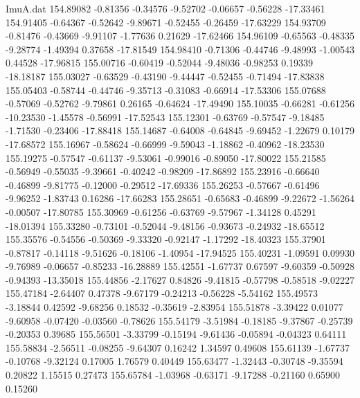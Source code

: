 \begin{filecontents}{ImuA.dat}
 154.89082   -0.81356   -0.34576   -9.52702   -0.06657   -0.56228  -17.33461
 154.91405   -0.64367   -0.52642   -9.89671   -0.52455   -0.26459  -17.63229
 154.93709   -0.81476   -0.43669   -9.91107   -1.77636    0.21629  -17.62466
 154.96109   -0.65563   -0.48335   -9.28774   -1.49394    0.37658  -17.81549
 154.98410   -0.71306   -0.44746   -9.48993   -1.00543    0.44528  -17.96815
 155.00716   -0.60419   -0.52044   -9.48036   -0.98253    0.19339  -18.18187
 155.03027   -0.63529   -0.43190   -9.44447   -0.52455   -0.71494  -17.83838
 155.05403   -0.58744   -0.44746   -9.35713   -0.31083   -0.66914  -17.53306
 155.07688   -0.57069   -0.52762   -9.79861    0.26165   -0.64624  -17.49490
 155.10035   -0.66281   -0.61256  -10.23530   -1.45578   -0.56991  -17.52543
 155.12301   -0.63769   -0.57547   -9.18485   -1.71530   -0.23406  -17.88418
 155.14687   -0.64008   -0.64845   -9.69452   -1.22679    0.10179  -17.68572
 155.16967   -0.58624   -0.66999   -9.59043   -1.18862   -0.40962  -18.23530
 155.19275   -0.57547   -0.61137   -9.53061   -0.99016   -0.89050  -17.80022
 155.21585   -0.56949   -0.55035   -9.39661   -0.40242   -0.98209  -17.86892
 155.23916   -0.66640   -0.46899   -9.81775   -0.12000   -0.29512  -17.69336
 155.26253   -0.57667   -0.61496   -9.96252   -1.83743    0.16286  -17.66283
 155.28651   -0.65683   -0.46899   -9.22672   -1.56264   -0.00507  -17.80785
 155.30969   -0.61256   -0.63769   -9.57967   -1.34128    0.45291  -18.01394
 155.33280   -0.73101   -0.52044   -9.48156   -0.93673   -0.24932  -18.65512
 155.35576   -0.54556   -0.50369   -9.33320   -0.92147   -1.17292  -18.40323
 155.37901   -0.87817   -0.14118   -9.51626   -0.18106   -1.40954  -17.94525
 155.40231   -1.09591    0.09930   -9.76989   -0.06657   -0.85233  -16.28889
 155.42551   -1.67737    0.67597   -9.60359   -0.50928   -0.94393  -13.35018
 155.44856   -2.17627    0.84826   -9.41815   -0.57798   -0.58518   -9.02227
 155.47184   -2.64407    0.47378   -9.67179   -0.24213   -0.56228   -5.54162
 155.49573   -3.18844    0.42592   -9.68256    0.18532   -0.35619   -2.83954
 155.51878   -3.39422    0.01077   -9.60958   -0.07420   -0.03560   -0.78626
 155.54179   -3.51984   -0.18185   -9.37867   -0.25739   -0.20353    0.39685
 155.56501   -3.33799   -0.15194   -9.61436   -0.05894   -0.04323    0.64111
 155.58834   -2.56511   -0.08255   -9.64307    0.16242    1.34597    0.49608
 155.61139   -1.67737   -0.10768   -9.32124    0.17005    1.76579    0.40449
 155.63477   -1.32443   -0.30748   -9.35594    0.20822    1.15515    0.27473
 155.65784   -1.03968   -0.63171   -9.17288   -0.21160    0.65900    0.15260

\end{filecontents}
